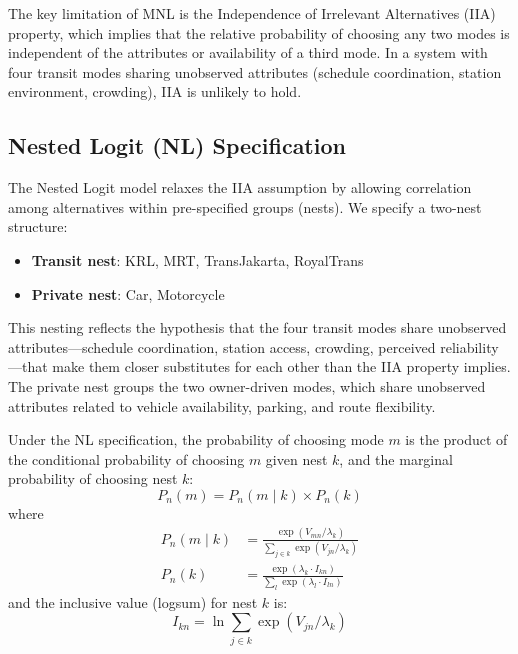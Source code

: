 \documentclass[12pt,a4paper]{article}
\begin{document}
The key limitation of MNL is the Independence of Irrelevant Alternatives (IIA) property, which implies that the relative probability of choosing any two modes is independent of the attributes or availability of a third mode. In a system with four transit modes sharing unobserved attributes (schedule coordination, station environment, crowding), IIA is unlikely to hold.

\subsection{Nested Logit (NL) Specification}

The Nested Logit model relaxes the IIA assumption by allowing correlation among alternatives within pre-specified groups (nests). We specify a two-nest structure:
\begin{itemize}[nosep]
    \item \textbf{Transit nest}: KRL, MRT, TransJakarta, RoyalTrans
    \item \textbf{Private nest}: Car, Motorcycle
\end{itemize}

This nesting reflects the hypothesis that the four transit modes share unobserved attributes---schedule coordination, station access, crowding, perceived reliability---that make them closer substitutes for each other than the IIA property implies. The private nest groups the two owner-driven modes, which share unobserved attributes related to vehicle availability, parking, and route flexibility.

Under the NL specification, the probability of choosing mode $m$ is the product of the conditional probability of choosing $m$ given nest $k$, and the marginal probability of choosing nest $k$:
\begin{equation}
P_n(m) = P_n(m \mid k) \times P_n(k)
\label{eq:nlprob}
\end{equation}
where
\begin{align}
P_n(m \mid k) &= \frac{\exp(V_{mn} / \lambda_k)}{\sum_{j \in k} \exp(V_{jn} / \lambda_k)} \label{eq:condprob}\\
P_n(k) &= \frac{\exp(\lambda_k \cdot I_{kn})}{\sum_l \exp(\lambda_l \cdot I_{ln})} \label{eq:nestprob}
\end{align}
and the inclusive value (logsum) for nest $k$ is:
\begin{equation}
I_{kn} = \ln \sum_{j \in k} \exp(V_{jn} / \lambda_k)
\label{eq:inclusive}
\end{equation}
\end{document}
